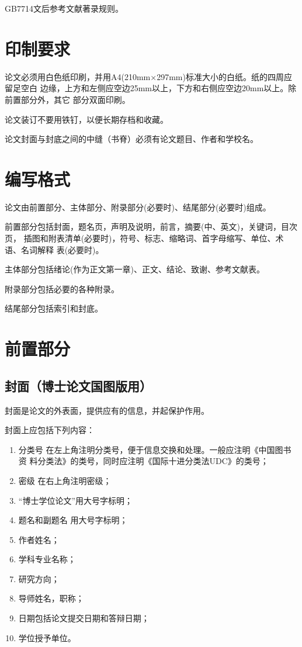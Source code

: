 \documentclass[master]{njuthesis}
\begin{document}
GB7714文后参考文献著录规则。

\section{印制要求}

论文必须用白色纸印刷，并用A4(210mm×297mm)标准大小的白纸。纸的四周应留足空白
边缘，上方和左侧应空边25mm以上，下方和右侧应空边20mm以上。除前置部分外，其它
部分双面印刷。

论文装订不要用铁钉，以便长期存档和收藏。

论文封面与封底之间的中缝（书脊）必须有论文题目、作者和学校名。

\section{编写格式}

论文由前置部分、主体部分、附录部分(必要时)、结尾部分(必要时)组成。

前置部分包括封面，题名页，声明及说明，前言，摘要(中、英文)，关键词，目次页，
插图和附表清单(必要时)，符号、标志、缩略词、首字母缩写、单位、术语、名词解释
表(必要时)。

主体部分包括绪论(作为正文第一章)、正文、结论、致谢、参考文献表。

附录部分包括必要的各种附录。

结尾部分包括索引和封底。

\section{前置部分}

\subsection{封面（博士论文国图版用）}

封面是论文的外表面，提供应有的信息，并起保护作用。

封面上应包括下列内容：
\begin{enumerate}
\item 分类号  在左上角注明分类号，便于信息交换和处理。一般应注明《中国图书资
  料分类法》的类号，同时应注明《国际十进分类法UDC》的类号；
\item 密级  在右上角注明密级；
\item “博士学位论文”用大号字标明；
\item 题名和副题名   用大号字标明；
\item 作者姓名；
\item 学科专业名称；
\item 研究方向；
\item 导师姓名，职称；
\item 日期包括论文提交日期和答辩日期；
\item 学位授予单位。
\end{enumerate}
\end{document}
